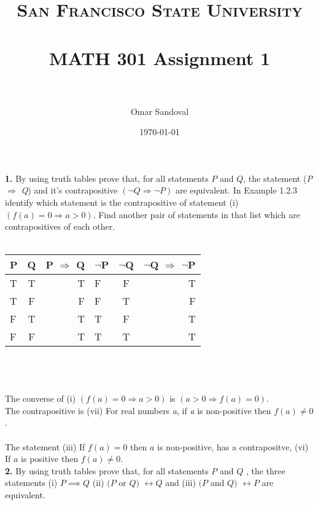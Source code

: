 \documentclass[paper=letter, fontsize=11pt]{scrartcl} %
\title{	
\normalfont \normalsize 
\textsc{San Francisco State University} \\ [25pt]
\horrule{0.5pt} \\[0.4cm] %
\huge MATH 301 Assignment 1  \\ %
\horrule{2pt} \\[0.5cm] %
}
\author{Omar Sandoval}
\date{\normalsize\today}
\begin{document}
\maketitle


\textbf{1.} By using truth tables prove that, for all statements $P$ and $Q$, the statement (\textit{P} $\Rightarrow$ \textit{Q}) and it's contrapositive $(\neg Q \Rightarrow \neg P)$ are equivalent. In Example 1.2.3 identify which statement is the contrapositive of statement (i) $(f(a)=0 \Rightarrow a >0)$. Find another pair of statements in that list which are contrapositives of each other.
\\\\
\begin{tabular} {| l | c | r | l | c | r |}
	\hline
	P & Q & P $\Rightarrow$ Q & $\neg$P & $\neg$Q & $\neg$Q $\Rightarrow$ $\neg$P \\ \hline
	T & T & T & F & F & T \\ \hline
	T & F & F & F & T & F \\ \hline
	F & T & T & T & F & T \\ \hline
	F & F & T & T & T & T \\ \hline
\end{tabular}
\\\\\\
The converse of (i) $(f(a)=0 \Rightarrow a > 0)$ is $(a >0 \Rightarrow f(a)=0)$.\\
The contrapositive is (vii) For real numbers \textit{a}, if \textit{a} is non-positive then $f(a)\not= 0$. 
\\\\
The statement (iii) If $f(a) = 0$ then $a$ is non-positive, has a contrapositve, (vi) If $a$ is positive then $f(a) \not= 0$.
\\


\textbf{2.} By using truth tables prove that, for all statements $P$ and $Q$ , the three statements (i)  $P \implies Q$ (ii) $(P$ or $Q )$ $\leftrightarrow Q$ and (iii) $( P$ and $Q )$ $\leftrightarrow P$ are equivalent.
\end{document}
